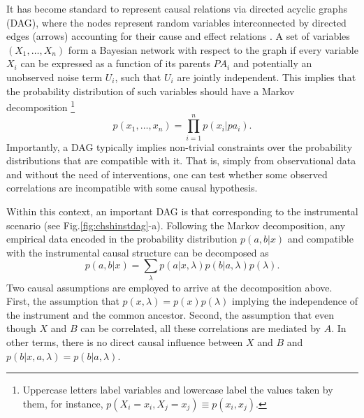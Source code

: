 \documentclass[letterpaper]{article}
\begin{document}
It has become standard to represent causal relations via directed acyclic graphs
(DAG), where the nodes represent random variables interconnected by directed
edges (arrows) accounting for their cause and effect relations \cite{pearlbook}.
A set of variables  $\left( X_1,\dots, X_n \right)$ form a Bayesian network with
respect to the graph if every variable $X_i$ can be expressed as a function of
its parents $PA_i$ and potentially an unobserved noise term $U_i$, such that
$U_i$ are jointly independent. This implies that the probability distribution of
such variables should have a Markov decomposition 
\footnote{Uppercase letters label variables and lowercase label the values taken
by them, for instance, $p(X_i =x_i, X_j = x_j) \equiv p(x_i, x_j)$.}
\begin{equation}
p(x_1,\dots,x_n)= \prod_{i=1}^{n} p(x_i \vert pa_i).    
\end{equation}
Importantly, a DAG typically implies non-trivial constraints over the
probability distributions that are compatible with it. That is, simply from
observational data and without the need of interventions, one can test whether
some observed correlations are incompatible with some causal hypothesis.


Within this context, an important DAG is that corresponding to the instrumental
scenario (see Fig.\ref{fig:chshinstdag}-a). Following the Markov decomposition, any
empirical data encoded in the probability distribution $p(a,b \vert x)$ and
compatible with the instrumental causal structure can be decomposed as
\begin{equation}
p(a,b \vert x) = \sum_{\lambda} p(a\vert x,\lambda) p(b\vert a,\lambda)p(\lambda).
\end{equation}
Two causal assumptions are employed to arrive at the decomposition above. First,
the assumption that $p(x,\lambda)=p(x)p(\lambda)$ implying the independence of
the instrument and the common ancestor. Second, the assumption that even though
$X$ and $B$ can be correlated, all these correlations are mediated by $A$. In
other terms, there is no direct causal influence between $X$ and $B$ and
$p(b\vert x,a,\lambda)=p(b\vert a,\lambda)$.
\end{document}
